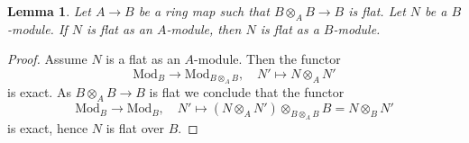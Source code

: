 \documentclass[10pt,a4paper]{amsart}
\theoremstyle{plain}
\newtheorem{lemma}[subsection]{Lemma}
\theoremstyle{definition}
\theoremstyle{remark}
\numberwithin{equation}{subsection}
\begin{document}
\begin{lemma}
\label{lemma-key}
Let $A \to B$ be a ring map such that $B \otimes_A B \to B$ is flat.
Let $N$ be a $B$-module. If $N$ is flat as an $A$-module, then
$N$ is flat as a $B$-module.
\end{lemma}

\begin{proof}
Assume $N$ is a flat as an $A$-module.
Then the functor
$$
\text{Mod}_B \longrightarrow \text{Mod}_{B \otimes_A B},\quad
N' \mapsto N \otimes_A N'
$$
is exact. As $B \otimes_A B \to B$ is flat we conclude that the functor
$$
\text{Mod}_B \longrightarrow \text{Mod}_B,\quad
N' \mapsto (N \otimes_A N') \otimes_{B \otimes_A B} B = N \otimes_B N'
$$
is exact, hence $N$ is flat over $B$.
\end{proof}
\end{document}
